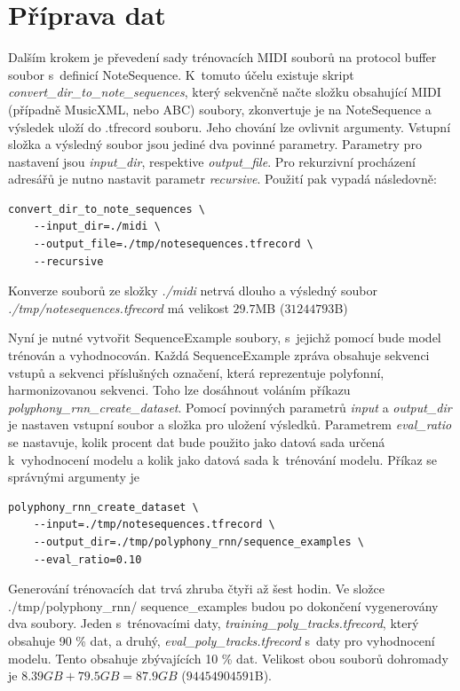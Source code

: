 \section{Příprava dat}
Dalším krokem je převedení sady trénovacích MIDI souborů na protocol buffer soubor
s~definicí NoteSequence.
K~tomuto účelu existuje skript \emph{convert\_dir\_to\_note\_sequences}, 
který sekvenčně načte složku obsahující MIDI (případně MusicXML, nebo ABC) soubory,
zkonvertuje je na NoteSequence a výsledek uloží do .tfrecord souboru.
Jeho chování lze ovlivnit argumenty.
Vstupní složka a výsledný soubor jsou jediné dva povinné parametry.
Parametry pro nastavení jsou \emph{input\_dir}, respektive \emph{output\_file}.
Pro rekurzivní procházení adresářů je nutno nastavit parametr \emph{recursive}.
\cite{google_git_polyphony}
Použití  pak vypadá následovně:

\begin{verbatim}
convert_dir_to_note_sequences \
    --input_dir=./midi \
    --output_file=./tmp/notesequences.tfrecord \
    --recursive
\end{verbatim} 
Konverze souborů ze složky \emph{./midi} netrvá dlouho
a výsledný soubor \emph{./tmp/notesequences.tfrecord}
má velikost $29.7$MB ($31244793$B)
\par

Nyní je nutné vytvořit SequenceExample soubory,
s~jejichž pomocí bude model trénován a vyhodnocován.
Každá SequenceExample zpráva obsahuje sekvenci vstupů a
sekvenci příslušných označení, 
která reprezentuje polyfonní, harmonizovanou sekvenci.
Toho lze dosáhnout voláním příkazu \emph{polyphony\_rnn\_create\_dataset}.
Pomocí povinných parametrů \emph{input} a \emph{output\_dir} 
je nastaven vstupní soubor a složka pro uložení výsledků.
Parametrem \emph{eval\_ratio} se nastavuje, kolik procent dat 
bude použito jako datová sada určená k~vyhodnocení modelu
a kolik jako datová sada k~trénování modelu.
\cite{google_git_polyphony}
Příkaz se správnými argumenty je

\begin{verbatim}
polyphony_rnn_create_dataset \
    --input=./tmp/notesequences.tfrecord \
    --output_dir=./tmp/polyphony_rnn/sequence_examples \
    --eval_ratio=0.10
\end{verbatim}
Generování trénovacích dat trvá zhruba čtyři až šest hodin.
Ve složce ./tmp/polyphony\_rnn/ sequence\_examples budou po dokončení
vygenerovány dva soubory. 
Jeden s~trénovacími daty, \emph{training\_poly\_tracks.tfrecord},
který obsahuje 90 \% dat,
a druhý, \emph{eval\_poly\_tracks.tfrecord} s~daty pro vyhodnocení modelu.
Tento obsahuje zbývajících 10 \% dat.
Velikost obou souborů dohromady je $8.39GB + 79.5GB = 87.9GB$ ($94 454 904 591$B).
\par

